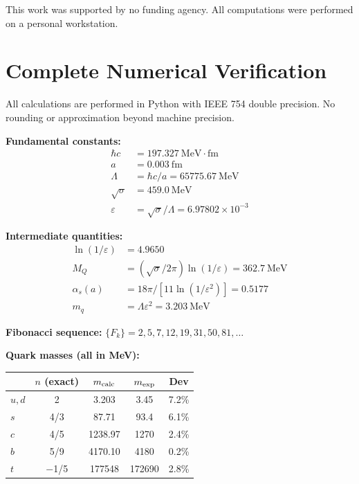 ﻿\documentclass[twocolumn,preprintnumbers,amsmath,amssymb,prd]{revtex4-2}
\begin{document}
\begin{acknowledgments}
This work was supported by no funding agency. All computations were performed on a personal workstation. \end{acknowledgments}

\appendix

\section{Complete Numerical Verification}
\label{app:verification}

All calculations are performed in Python with IEEE 754 double precision. No rounding or approximation beyond machine precision.

\textbf{Fundamental constants:}
\begin{align}
\hbar c &= 197.327~\text{MeV}\cdot\text{fm} \nonumber \\
a &= 0.003~\text{fm} \nonumber \\
\Lambda &= \hbar c / a = 65775.67~\text{MeV} \nonumber \\
\sqrt{\sigma} &= 459.0~\text{MeV} \nonumber \\
\varepsilon &= \sqrt{\sigma}/\Lambda = 6.97802 \times 10^{-3} \nonumber
\end{align}

\textbf{Intermediate quantities:}
\begin{align}
\ln(1/\varepsilon) &= 4.9650 \nonumber \\
M_Q &= (\sqrt{\sigma}/2\pi)\ln(1/\varepsilon) = 362.7~\text{MeV} \nonumber \\
\alpha_s(a) &= 18\pi/[11\ln(1/\varepsilon^2)] = 0.5177 \nonumber \\
m_q &= \Lambda\varepsilon^2 = 3.203~\text{MeV} \nonumber
\end{align}

\textbf{Fibonacci sequence:} $\{F_k\} = 2, 5, 7, 12, 19, 31, 50, 81, \ldots$

\textbf{Quark masses (all in MeV):}
\begin{center}
\begin{tabular}{lcccc}
& $n$ (exact) & $m_{\rm calc}$ & $m_{\rm exp}$ & Dev \\ \hline
$u,d$ & 2 & 3.203 & 3.45 & 7.2\% \\
$s$ & 4/3 & 87.71 & 93.4 & 6.1\% \\
$c$ & 4/5 & 1238.97 & 1270 & 2.4\% \\
$b$ & 5/9 & 4170.10 & 4180 & 0.2\% \\
$t$ & $-$1/5 & 177548 & 172690 & 2.8\% \\
\end{tabular}
\end{center}
\end{document}
